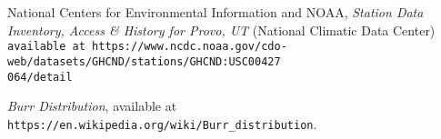 \documentclass[letterpaper,12pt]{article}
\begin{document}
\begin{thebibliography}{99}

 National Centers for Environmental Information and NOAA, \textit{Station Data Inventory, Access \& History for Provo, UT} (National Climatic Data Center) \texttt{available at https://www.ncdc.noaa.gov/cdo-web/datasets/GHCND/stations/GHCND:USC00427 \\ 064/detail}

 \emph{Burr Distribution},  available at
\texttt{https://en.wikipedia.org/wiki/Burr\_distribution}.




\end{thebibliography}
\end{document}
